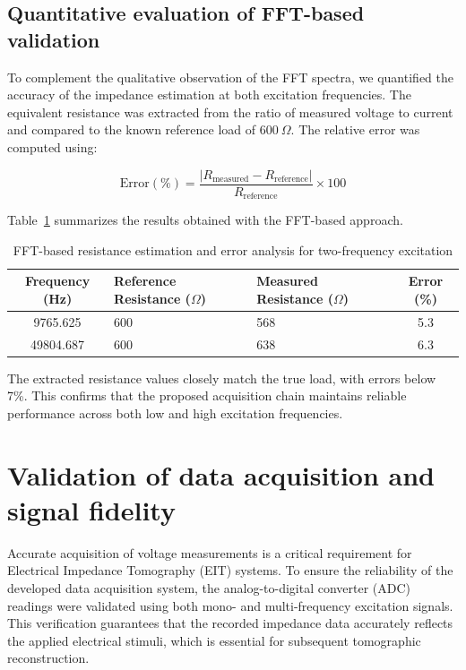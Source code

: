 \subsection{Quantitative evaluation of FFT-based validation}

To complement the qualitative observation of the FFT spectra, we quantified the accuracy of the impedance estimation at both excitation frequencies. The equivalent resistance was extracted from the ratio of measured voltage to current and compared to the known reference load of $600~\Omega$. The relative error was computed using:

\begin{equation}
\text{Error}(\%) = \frac{|R_{\text{measured}} - R_{\text{reference}}|}{R_{\text{reference}}} \times 100
\end{equation}

Table~\ref{tab:fft_eval} summarizes the results obtained with the FFT-based approach.

\begin{table}[H]
\centering
\caption{FFT-based resistance estimation and error analysis for two-frequency excitation}
\label{tab:fft_eval}
\begin{tabular}{|c|p{4cm}|p{4cm}|c|}
\hline
\textbf{Frequency (Hz)} & \textbf{Reference Resistance ($\Omega$)} & \textbf{Measured Resistance ($\Omega$)} & \textbf{Error (\%)} \\ \hline
9765.625  & 600 & 568   & 5.3  \\ \hline
49804.687 & 600 & 638   & 6.3  \\ \hline
\end{tabular}
\end{table}

The extracted resistance values closely match the true load, with errors below 7\%. This confirms that the proposed acquisition chain maintains reliable performance across both low and high excitation frequencies. 


\section{Validation of data acquisition and signal fidelity}
\label{sec:adc_validation}

Accurate acquisition of voltage measurements is a critical requirement for Electrical Impedance Tomography (EIT) systems. To ensure the reliability of the developed data acquisition system, the analog-to-digital converter (ADC) readings were validated using both mono- and multi-frequency excitation signals. This verification guarantees that the recorded impedance data accurately reflects the applied electrical stimuli, which is essential for subsequent tomographic reconstruction.


